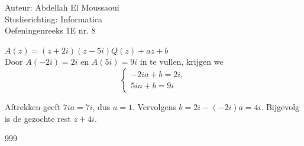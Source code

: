 \documentclass[a4paper]{article}
\begin{document}
  
\noindent \large Auteur: Abdellah El Moussaoui \\
\noindent \large Studierichting: Informatica\\
\noindent \large Oefeningenreeks 1E nr. 8\\

\medskip

\normalsize

\medskip

$A(z) = (z + 2i)(z - 5i)Q(z) + az + b$\\

Door $A(-2i)=2i$ en $A(5i)=9i$ in te vullen, krijgen we\\

$$
\left\{
\begin{array}{l}
-2ia + b = 2i,\\
5ia + b = 9i
\end{array}
\right.
$$

Aftrekken geeft $7ia = 7i$, dus $a=1$. Vervolgens $b = 2i - (-2i)a = 4i$.
Bijgevolg is de gezochte rest $z + 4i$.

\begin{thebibliography}{999}
\end{thebibliography}
\end{document}
